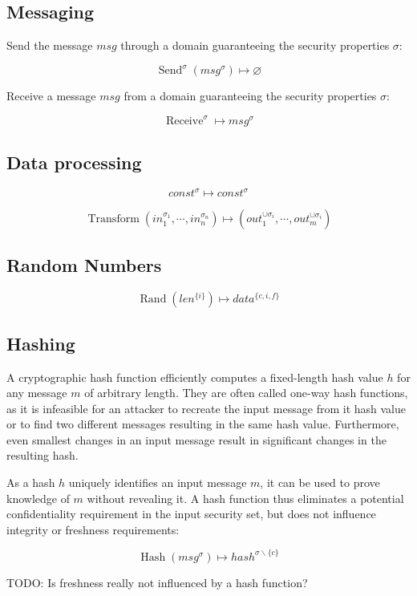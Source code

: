 \documentclass[a4paper]{article}
\DeclareMathOperator{\hash}{Hash}
\DeclareMathOperator{\trans}{Transform}
\DeclareMathOperator{\rand}{Rand}
\DeclareMathOperator{\send}{Send}
\DeclareMathOperator{\recv}{Receive}
\newcommand{\TODO}[1]{\small\noindent\color{red} TODO: #1\color{black}}
\newcommand{\emptysec}{\varnothing}
\newcommand{\secminus}{\smallsetminus}
\begin{document}
\subsection{Messaging}

Send the message $msg$ through a domain guaranteeing the security properties $\sigma$:

$$\send^\sigma(msg^\sigma) \mapsto \emptysec$$

Receive a message $msg$ from a domain guaranteeing the security properties $\sigma$:

$$\recv^\sigma \mapsto msg^\sigma$$

\subsection{Data processing}

$$const^{\sigma} \mapsto const^{\sigma}$$

$$\trans(in_1^{\sigma_1}, \cdots, in_n^{\sigma_n}) \mapsto (out_1^{\cup\sigma_i},\cdots,out_m^{\cup\sigma_i})$$

\subsection{Random Numbers}

$$\rand(len^{\{i\}}) \mapsto data^{\{c,i,f\}}$$

\subsection{Hashing}

A cryptographic hash function efficiently computes a fixed-length hash value
$h$ for any message $m$ of arbitrary length. They are often called one-way hash
functions, as it is infeasible for an attacker to recreate the input message
from it hash value or to find two different messages resulting in the same hash
value. Furthermore, even smallest changes in an input message result in
significant changes in the resulting hash.

As a hash $h$ uniquely identifies an input message $m$, it can be used to prove
knowledge of $m$ without revealing it. A hash function thus eliminates a
potential confidentiality requirement in the input security set, but does not
influence integrity or freshness requirements:

$$\hash(msg^\sigma) \mapsto hash^{\sigma\secminus\{c\}}$$

\TODO{Is freshness really not influenced by a hash function?}
\end{document}
